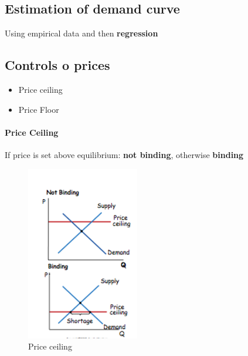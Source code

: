 \documentclass[a4paper,titlepage] {scrartcl}
\begin{document}
\subsection{Estimation of demand curve}
Using empirical data and then \textbf{regression}

\subsection{Controls o prices}
\begin{itemize}
	\item Price ceiling
	\item Price Floor
\end{itemize}

\paragraph{Price Ceiling} %
If price is set above equilibrium: \textbf{not binding}, otherwise \textbf{binding}
\label{par:price_ceiling}
\begin{figure}[htbp]
	\centering
		\includegraphics[height=3in]{images/ceiling.png}
	\caption{Price ceiling}
	\label{fig:images_ceiling}
\end{figure}

\end{document}
